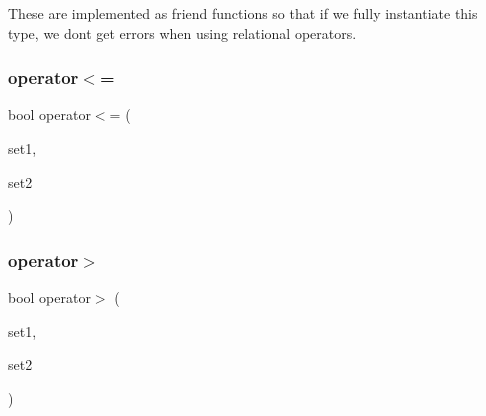 These are implemented as friend functions so that if we fully instantiate this type, we don\textquotesingle{}t get errors when using relational operators. \mbox{\label{classstanfordcpplib_1_1collections_1_1GenericSet_a65e20d362dfabf8b6592439af08e9c45}} 
\subsubsection{\texorpdfstring{operator$<$=}{operator<=}}
{\footnotesize\ttfamily bool operator$<$= (\begin{DoxyParamCaption}\item[{const \mbox{\hyperlink{classstanfordcpplib_1_1collections_1_1GenericSet}{Generic\+Set}}$<$ Traits $>$ \&}]{set1,  }\item[{const \mbox{\hyperlink{classstanfordcpplib_1_1collections_1_1GenericSet}{Generic\+Set}}$<$ Traits $>$ \&}]{set2 }\end{DoxyParamCaption})\hspace{0.3cm}{\ttfamily [friend]}}

\mbox{\label{classstanfordcpplib_1_1collections_1_1GenericSet_add56ec57acd73fce18db96d132e25212}} 
\subsubsection{\texorpdfstring{operator$>$}{operator>}}
{\footnotesize\ttfamily bool operator$>$ (\begin{DoxyParamCaption}\item[{const \mbox{\hyperlink{classstanfordcpplib_1_1collections_1_1GenericSet}{Generic\+Set}}$<$ Traits $>$ \&}]{set1,  }\item[{const \mbox{\hyperlink{classstanfordcpplib_1_1collections_1_1GenericSet}{Generic\+Set}}$<$ Traits $>$ \&}]{set2 }\end{DoxyParamCaption})\hspace{0.3cm}{\ttfamily [friend]}}

